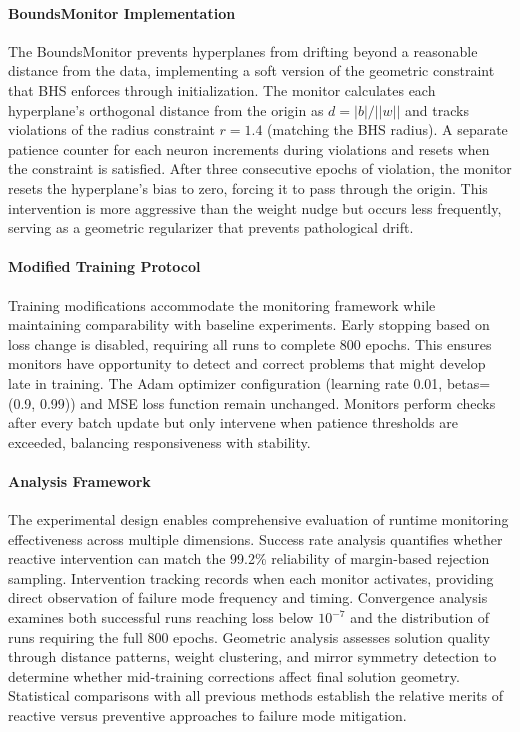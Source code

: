 \paragraph{BoundsMonitor Implementation}  
The BoundsMonitor prevents hyperplanes from drifting beyond a reasonable distance from the data, implementing a soft version of the geometric constraint that BHS enforces through initialization. The monitor calculates each hyperplane's orthogonal distance from the origin as $d = |b| / ||w||$ and tracks violations of the radius constraint $r = 1.4$ (matching the BHS radius). A separate patience counter for each neuron increments during violations and resets when the constraint is satisfied. After three consecutive epochs of violation, the monitor resets the hyperplane's bias to zero, forcing it to pass through the origin. This intervention is more aggressive than the weight nudge but occurs less frequently, serving as a geometric regularizer that prevents pathological drift.

\paragraph{Modified Training Protocol}
Training modifications accommodate the monitoring framework while maintaining comparability with baseline experiments. Early stopping based on loss change is disabled, requiring all runs to complete 800 epochs. This ensures monitors have opportunity to detect and correct problems that might develop late in training. The Adam optimizer configuration (learning rate 0.01, betas=(0.9, 0.99)) and MSE loss function remain unchanged. Monitors perform checks after every batch update but only intervene when patience thresholds are exceeded, balancing responsiveness with stability.

\paragraph{Analysis Framework}
The experimental design enables comprehensive evaluation of runtime monitoring effectiveness across multiple dimensions. Success rate analysis quantifies whether reactive intervention can match the 99.2\% reliability of margin-based rejection sampling. Intervention tracking records when each monitor activates, providing direct observation of failure mode frequency and timing. Convergence analysis examines both successful runs reaching loss below $10^{-7}$ and the distribution of runs requiring the full 800 epochs. Geometric analysis assesses solution quality through distance patterns, weight clustering, and mirror symmetry detection to determine whether mid-training corrections affect final solution geometry. Statistical comparisons with all previous methods establish the relative merits of reactive versus preventive approaches to failure mode mitigation.


